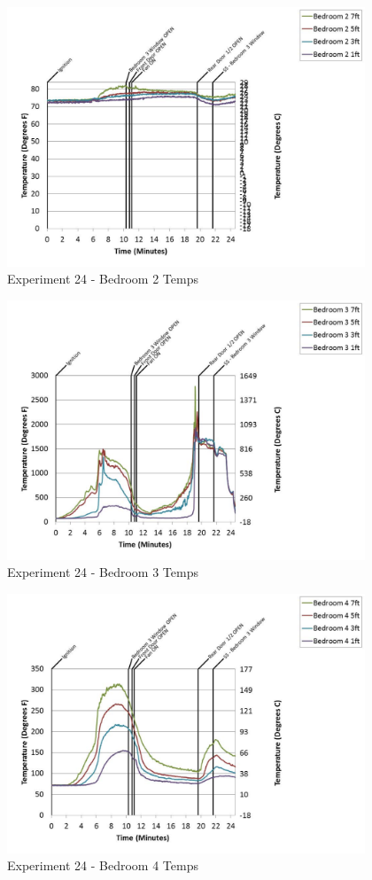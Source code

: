 \documentclass{article}
\begin{document}
\begin{appendices}
	\clearpage

	\begin{figure}[h!]
		\centering
		\includegraphics[height=3.05in]{0_Images/Results_Charts/Exp_24_Charts/Bedroom2Temps.pdf}
		\caption{Experiment 24 - Bedroom 2 Temps}
	\end{figure}
 

	\begin{figure}[h!]
		\centering
		\includegraphics[height=3.05in]{0_Images/Results_Charts/Exp_24_Charts/Bedroom3Temps.pdf}
		\caption{Experiment 24 - Bedroom 3 Temps}
	\end{figure}
 
	\clearpage

	\begin{figure}[h!]
		\centering
		\includegraphics[height=3.05in]{0_Images/Results_Charts/Exp_24_Charts/Bedroom4Temps.pdf}
		\caption{Experiment 24 - Bedroom 4 Temps}
	\end{figure}
 


\end{appendices}
\end{document}
